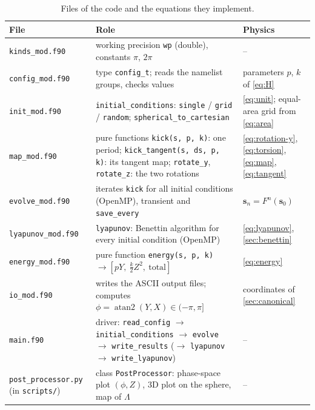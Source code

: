 \documentclass[11pt,a4paper]{article}
\newcommand{\vs}{\bm{s}}
\begin{document}
\begin{table}[!htbp]
  \centering
  \small
  \begin{tabular}{p{3.2cm}p{7.0cm}p{4.2cm}}
    \toprule
    File & Role & Physics \\
    \midrule
    \texttt{kinds\_mod.f90} & working precision \texttt{wp} (double), constants $\pi$, $2\pi$ & -- \\
    \texttt{config\_mod.f90} & type \texttt{config\_t}; reads the namelist groups, checks values & parameters $p$, $k$ of \eqref{eq:H} \\
    \texttt{init\_mod.f90} & \texttt{initial\_conditions}: \texttt{single} / \texttt{grid} / \texttt{random}; \texttt{spherical\_to\_cartesian} & \eqref{eq:unit}; equal-area grid from \eqref{eq:area} \\
    \texttt{map\_mod.f90} & pure functions \texttt{kick(s, p, k)}: one period; \texttt{kick\_tangent(s, ds, p, k)}: its
    tangent map; \texttt{rotate\_y}, \texttt{rotate\_z}: the two rotations & \eqref{eq:rotation-y}, \eqref{eq:torsion}, \eqref{eq:map}, \eqref{eq:tangent} \\
    \texttt{evolve\_mod.f90} & iterates \texttt{kick} for all initial conditions (OpenMP), transient and \texttt{save\_every} & $\vs_n = F^n(\vs_0)$ \\
    \texttt{lyapunov\_mod.f90} & \texttt{lyapunov}: Benettin algorithm for every initial condition (OpenMP) & \eqref{eq:lyapunov}, \cref{sec:benettin} \\
    \texttt{energy\_mod.f90} & pure function \texttt{energy(s, p, k)} $\to [pY,\ \frac k2 Z^2,\ \text{total}]$ & \eqref{eq:energy} \\
    \texttt{io\_mod.f90} & writes the ASCII output files; computes $\phi = \operatorname{atan2}(Y,X) \in (-\pi,\pi]$ & coordinates of \cref{sec:canonical} \\
    \texttt{main.f90} & driver: \texttt{read\_config} $\to$ \texttt{initial\_conditions} $\to$ \texttt{evolve} $\to$ \texttt{write\_results} ($\to$ \texttt{lyapunov} $\to$ \texttt{write\_lyapunov}) & -- \\
    \texttt{post\_processor.py} (in \texttt{scripts/}) & class \texttt{PostProcessor}: phase-space plot $(\phi, Z)$, 3D plot on the sphere, map of $\Lambda$ & -- \\
    \bottomrule
  \end{tabular}
  \caption{Files of the code and the equations they implement.}
  \label{tab:modules}
\end{table}
\end{document}
